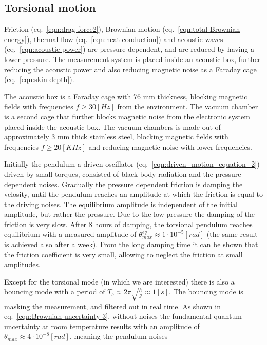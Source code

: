 \documentclass[\main/master.tex]{subfiles}
\begin{document}
\subsection{Torsional motion}
Friction (eq.~\ref{eqn:drag force2}), Brownian motion (eq.~\ref{eqn:total Brownian energy}), thermal flow (eq.~\ref{eqn:heat conduction}) and acoustic waves (eq.~\ref{eqn:acoustic power}) are pressure dependent, and are reduced by having a lower pressure. The measurement system is placed inside an acoustic box, further reducing the acoustic power and also reducing magnetic noise as a Faraday cage (eq.~\ref{eqn:skin depth}). 
\par\noindent
The acoustic box is a Faraday cage with 76 mm thickness, blocking magnetic fields with frequencies $f \ge 30 [Hz]$ from the environment. The vacuum chamber is a second cage that further blocks magnetic noise from the electronic system placed inside the acoustic box. The vacuum chambers is made out of approximately 3 mm thick stainless steel, blocking magnetic fields with frequencies $f\ge 20 [KHz]$ and reducing magnetic noise with lower frequencies.
\par\noindent
Initially the pendulum a driven oscillator (eq.~\ref{eqn:driven_motion_equation_2}) driven by small torques, consisted of black body radiation and the pressure dependent noises. Gradually the pressure dependent friction is damping the velosity, until the pendulum reaches an amplitude at which the friction is equal to the driving noises. The equilibrium amplitude is independent of the initial amplitude, but rather the pressure. Due to the low pressure the damping of the friction is very slow. After 8 hours of damping, the torsional pendulum reaches equilibrium with a measured amplitude of $\theta_{max}^{eq}\approx 1\cdot10^{-5}[rad]$ (the same result is achieved also after a week). From the long damping time it can be shown that the friction coefficient is very small, allowing to neglect the friction at small amplitudes.
\par\noindent
Except for the torsional mode (in which we are interested) there is also a bouncing mode with a period of $T_b\approx 2\pi\sqrt{\frac{h}{g}}\approx 1[s]$. The bouncing mode is masking the measurement, and filtered out in real time. 
As shown in eq.~\ref{eqn:Brownian uncertainty 3}, without noises the fundamental quantum uncertainty at room temperature results with an amplitude of  $\theta_{max}  \approx 4\cdot 10^{-8} [rad] $, meaning the pendulum noises  
\par\noindent
 
\end{document}

